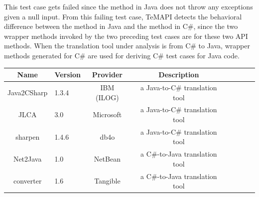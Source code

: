 This test case gets failed since the  method in Java does not throw any exceptions given a null input.
From this failing test case, TeMAPI detects the behavioral difference between the  method in Java and the  method in C\#, since the two wrapper methods invoked by the two preceding test cases are for these two API methods. When the translation tool under analysis is from C\# to Java, wrapper methods generated for C\# are used for deriving C\# test cases for Java code.


\label{sec:approach:sequence}
\begin{table}[t]
\centering
\begin{SmallOut}
\begin {tabular} {|c|l|c|c|c|c|c|c|}
\hline
\textbf{Name}& \textbf{Version}& \textbf{Provider} &\textbf{Description}\\
\hline
Java2CSharp  &  1.3.4 & IBM (ILOG) & a Java-to-C\# translation tool\\
\hline
JLCA         &  3.0   & Microsoft  & a Java-to-C\# translation tool\\
\hline
sharpen      &  1.4.6 & db4o       & a Java-to-C\# translation tool \\
\hline
Net2Java     &  1.0   & NetBean    & a C\#-to-Java translation tool\\
\hline
converter    &  1.6   & Tangible   & a C\#-to-Java translation tool\\
\hline
\end{tabular}%
 \label{table:subjects}
\end{SmallOut}\vspace*{-6ex}
\end{table}

